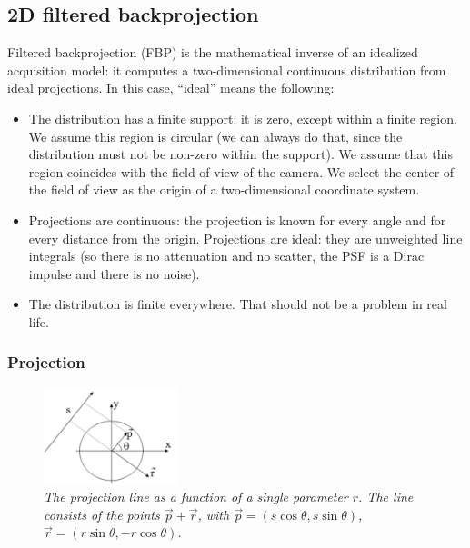 \documentclass[11pt,oneside]{book}
\begin{document}
\subsection{2D filtered backprojection}
Filtered backprojection (FBP) is the mathematical inverse of an idealized
acquisition model: it computes a two-dimensional continuous distribution from
ideal projections. In this case, ``ideal'' means the following:
\begin{itemize}
\item
The distribution has a finite support: it is zero, except within a finite
region.  We assume this region is circular (we can always do that, since the
distribution must not be non-zero within the support). We assume that this
region coincides with the field of view of the camera. We select the center of
the field of view as the origin of a two-dimensional coordinate system.

\item
Projections are continuous: the projection is known for every angle and for
every distance from the origin. Projections are ideal: they are unweighted
line integrals (so there is no attenuation and no scatter, the PSF is a Dirac
impulse and there is no noise).

\item
The distribution is finite everywhere. That should not be a problem in real
life.

\end{itemize}

\subsubsection{Projection}
\begin{figure}[tb]
\centering
\includegraphics[width=0.35\textwidth]{figs/fig_fbp_math.pdf}
\caption{\label{fig:fbp_math} \emph{The projection line as a function of a
single parameter $r$. The line consists of the points $\vec{p} + \vec{r}$,
with $\vec{p} = (s \cos \theta, s \sin \theta)$, $\vec{r} = (r \sin \theta, - r
\cos \theta)$.}}
\end{figure}
\end{document}
